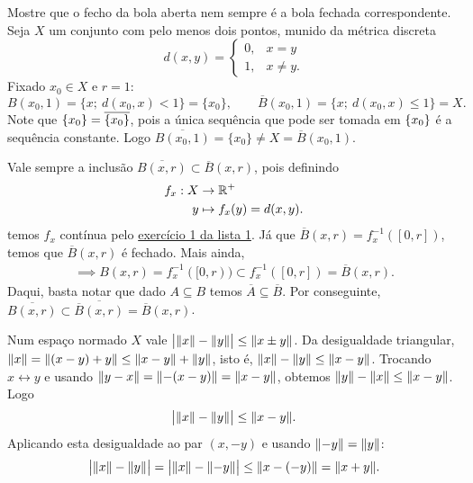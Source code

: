 \begin{exercicio}{Mostre que o fecho da bola aberta nem sempre é a bola fechada correspondente.} \\
Seja $X$ um conjunto com pelo menos dois pontos, munido da métrica discreta
\[ d(x,y)=\begin{cases} 0,& x=y\\ 1,& x\neq y.\end{cases} \]
Fixado $x_0\in X$ e $r=1$:
\[ B(x_0,1)=\{x;\ d(x_0,x)<1\}=\{x_0\}, \qquad \overline{B}(x_0,1)=\{x;\ d(x_0,x)\le 1\}=X. \]
  Note que $\{x_0\} = \overline{\left\{x_0\right\}}$, pois a única sequência que pode ser tomada em $\left\{x_0\right\}$ é a sequência constante. 
Logo $\overline{B(x_0,1)}=\{x_0\}\neq X=\overline{B}(x_0,1)$.

\begin{obs}
Vale sempre a inclusão $\overline{B(x,r)}\subset \overline{B}(x,r)$,
  pois definindo 
\begin{align*}
  f_x: X &\to \mathbb R^+\\
  y &\mapsto f_x(y) = d(x, y).
\end{align*}
  temos $f_x$ contínua pelo \hyperlink{sol:lista1:1}{exercício 1 da lista 1}. Já que
  $\overline{B}(x,r) = f_x^{-1}([0, r])$, temos que $\overline{B}(x, r)$ é fechado. 
  Mais ainda,
  \begin{align*}
    [0, r) \subset [0, r] \implies B(x, r) = f_x^{-1}([0, r)) \subset f_x^{-1}([0, r]) = \overline B(x, r).
  \end{align*} 
Daqui, basta notar que dado $A \subseteq B$ temos $\overline A \subseteq \overline B$. Por conseguinte, 
  $\overline{B(x, r)} \subset \overline{\overline B(x, r)} = \overline B(x, r)$.
\end{obs}
\end{exercicio}

\begin{exercicio}{Num espaço normado $X$ vale $\bigl|\lVert x\rVert-\lVert y\rVert\bigr|\le \lVert x\pm y\rVert$.}
\sol
Da desigualdade triangular, $\lVert x\rVert=\lVert(x-y)+y\rVert\le \lVert x-y\rVert+\lVert y\rVert$, isto é, $\lVert x\rVert-\lVert y\rVert\le\lVert x-y\rVert$. Trocando $x\leftrightarrow y$ e usando $\lVert y-x\rVert=\lVert-(x-y)\rVert=\lVert x-y\rVert$, obtemos $\lVert y\rVert-\lVert x\rVert\le \lVert x-y\rVert$. Logo
\[ \bigl|\lVert x\rVert-\lVert y\rVert\bigr|\le \lVert x-y\rVert. \]
Aplicando esta desigualdade ao par $(x,-y)$ e usando $\lVert-y\rVert=\lVert y\rVert$:
\[ \bigl|\lVert x\rVert-\lVert y\rVert\bigr| = \bigl|\lVert x\rVert-\lVert-y\rVert\bigr| \le \lVert x-(-y)\rVert=\lVert x+y\rVert. \]
\end{exercicio}

